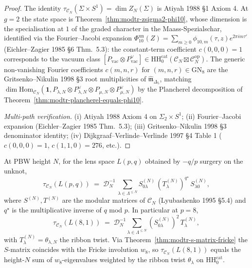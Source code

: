 \begin{proof}
The identity $\tau_{\mathcal C_N}(\Sigma\times S^1) = \dim Z_N(\Sigma)$ is
Atiyah 1988 \S 1 Axiom 4. At $g = 2$ the state space is
Theorem~\ref{thm:modtr-zsigma2-phi10}, whose dimension is the
specialisation at \(1\) of the graded character in the
Maass-Spezialschar, identified via the Fourier--Jacobi expansion
$\Phi_{10}^{\mathrm{un}}(Z) = \sum_{m\geq 0}\phi_{10,m}(\tau,z) e^{2\pi im\tau'}$
(Eichler--Zagier 1985 \S 6 Thm.~5.3): the constant-term
coefficient $c(0,0,0) = 1$ corresponds to the vacuum class
$[P_{\mathrm{vac}}\otimes P_{\mathrm{vac}}^\vee]\in\mathrm{HH}_0^{\mathrm{cat}}
(\mathcal C_N\boxtimes\mathcal C_N^{\mathrm{op}})$. The generic
non-vanishing Fourier coefficients $c(m, n, r)$ for
$(m, n, r)\in\mathrm{GN}_8$ are the Gritsenko--Nikulin 1998 \S 3 root
multiplicities of $\widehat{\mathfrak m}_{\Delta_5}$, matching
\(\dim\mathrm{Hom}_{\mathcal C_N}(\mathbf 1, P_{\lambda,N}\otimes
P_{\lambda,N}^\vee\otimes P_{\mu,N}\otimes P_{\mu,N}^\vee)\) by the
Plancherel decomposition of Theorem~\ref{thm:modtr-plancherel-equals-phi10}.

\emph{Multi-path verification.}
(i) Atiyah 1988 Axiom 4 on $\Sigma_2\times S^1$;
(ii) Fourier--Jacobi expansion (Eichler--Zagier 1985 Thm.~5.3);
(iii) Gritsenko--Nikulin 1998 \S 3 denominator identity;
(iv) Dijkgraaf--Verlinde--Verlinde 1997 \S 4 Table 1
($c(0,0,0) = 1$, $c(1,1,0) = 276$, etc.).
\end{proof}

\begin{theorem}
\label{thm:modtr-rt-lens}
At PBW height \(N\), for the lens space $L(p, q)$ obtained by $-q/p$
surgery on the unknot,
\[
 \tau_{\mathcal C_N}(L(p, q))
 \;=\;
 \mathcal D_N^{-1}\,
 \sum_{\lambda\in\Lambda^{\leq N}}
 S^{(N)}_{0\lambda}\,(T^{(N)}_\lambda)^{q^\star}\,
 S^{(N)}_{\lambda 0},
\]
where \(S^{(N)},T^{(N)}\) are the modular matrices of \(\mathcal C_N\)
(Lyubashenko 1995 \S 5.4) and $q^\star$ is the multiplicative inverse
of $q$ mod $p$. In particular at $p = 8$,
\[
 \tau_{\mathcal C_N}(L(8, 1))
 \;=\;
 \mathcal D_N^{-1}
 \sum_{\lambda\in\Lambda^{\leq N}} (S^{(N)}_{0\lambda})^2\,
 T^{(N)}_\lambda,
\]
with \(T^{(N)}_\lambda = \theta_{\lambda,N}\) the ribbon twist. Via
Theorem~\ref{thm:modtr-s-matrix-fricke} the $S$-matrix coincides
with the Fricke involution $w_8$, so
\(\tau_{\mathcal C_N}(L(8, 1))\) equals the height-\(N\) sum of
\(w_8\)-eigenvalues
weighted by the ribbon twist $\theta_\lambda$ on
$\mathrm{HH}_0^{\mathrm{cat}}$.
\end{theorem}

